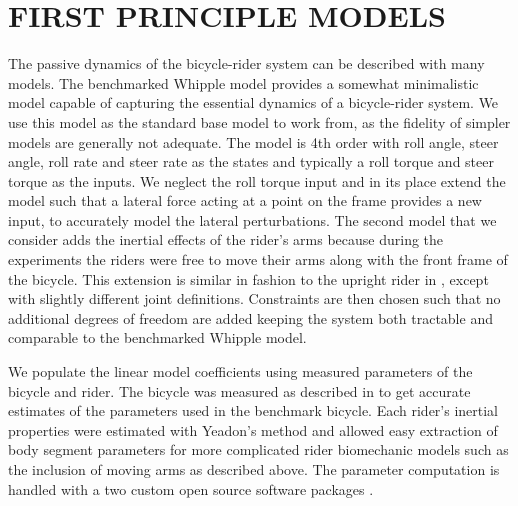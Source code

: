 \documentclass[twocolumn,10pt]{asme2e}
\begin{document}
\section*{FIRST PRINCIPLE MODELS}
The passive dynamics of the bicycle-rider system can be described with many
models. The benchmarked \cite{Meijaard2007,Basu-Mandal2007} Whipple model
\cite{Whipple1899} provides a somewhat minimalistic model capable of capturing
the essential dynamics of a bicycle-rider system. We use this model as the
standard base model to work from, as the fidelity of simpler models are
generally not adequate. The model is 4th order with roll angle, steer angle,
roll rate and steer rate as the states and typically a roll torque and steer
torque as the inputs. We neglect the roll torque input and in its place extend
the model such that a lateral force acting at a point on the frame provides a
new input, to accurately model the lateral perturbations. The second model that
we consider adds the inertial effects of the rider's arms because during the
experiments the riders were free to move their arms along with the front frame
of the bicycle. This extension is similar in fashion to the upright rider in
\cite{Schwab2012}, except with slightly different joint definitions.
Constraints are then chosen such that no additional degrees of freedom are
added keeping the system both tractable and comparable to the benchmarked
Whipple model.

We populate the linear model coefficients using measured parameters of the
bicycle and rider. The bicycle was measured as described in \cite{Moore2010} to
get accurate estimates of the parameters used in the benchmark bicycle.  Each
rider's inertial properties were estimated with Yeadon's method
\cite{Yeadon1990a} and allowed easy extraction of body segment parameters for
more complicated rider biomechanic models such as the inclusion of moving arms
as described above. The parameter computation is handled with a two custom open
source software packages \cite{Moore2011a,Dembia2011}.
\end{document}
